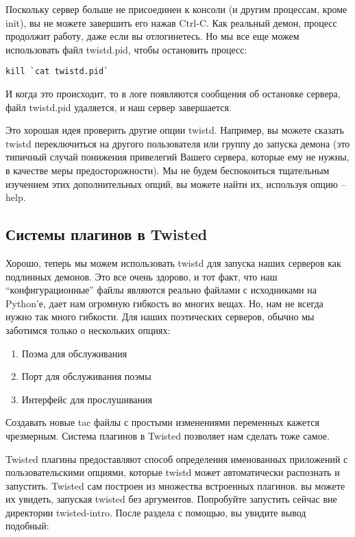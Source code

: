 Поскольку сервер больше не присоединен к консоли (и 
другим процессам, кроме init), вы не можете завершить его 
нажав Ctrl-C. Как реальный демон, процесс продолжит работу, 
даже если вы отлогинетесь. Но мы все еще можем использовать 
файл twistd.pid, чтобы остановить процесс:

 \begin{verbatim}
kill `cat twistd.pid`
\end{verbatim} 


И когда это происходит, то в логе появляются 
сообщения об остановке сервера, файл twistd.pid 
удаляется, и наш сервер завершается.


Это хорошая идея проверить другие опции twistd. 
Например, вы можете сказать twistd переключиться на 
другого пользователя или группу до запуска демона (это 
типичный случай понижения привелегий Вашего сервера, 
которые ему не нужны, в качестве меры предосторожности). 
Мы не будем беспокоиться тщательным изучением этих 
дополнительных опций, вы можете найти их, используя 
опцию --help. 


\subsection{Системы плагинов в Twisted}

Хорошо, теперь мы можем использовать twistd для запуска 
наших серверов как подлинных демонов. Это все очень 
здорово, и тот факт, что наш ``конфигурационные'' файлы 
являются реально файлами с исходниками на Python'е, дает 
нам огромную гибкость во многих вещах. Но, нам не всегда 
нужно так много гибкости. Для наших поэтических серверов, 
обычно мы заботимся только о нескольких опциях:

\begin{enumerate}
\item Поэма для обслуживания
\item Порт для обслуживания поэмы
\item Интерфейс для прослушивания
\end{enumerate}


Создавать новые tac файлы с простыми изменениями 
переменных кажется чрезмерным. Система плагинов в 
Twisted позволяет нам сделать тоже самое.


Twisted плагины предоставляют способ 
определения именованных приложений с 
пользовательскими опциями, которые 
twistd может автоматически распознать и 
запустить. Twisted сам построен из 
множества встроенных плагинов. вы можете 
их увидеть, запуская twisted без аргументов. Попробуйте 
запустить сейчас вне директории twisted-intro. 
После раздела с помощью, вы увидите вывод подобный:

